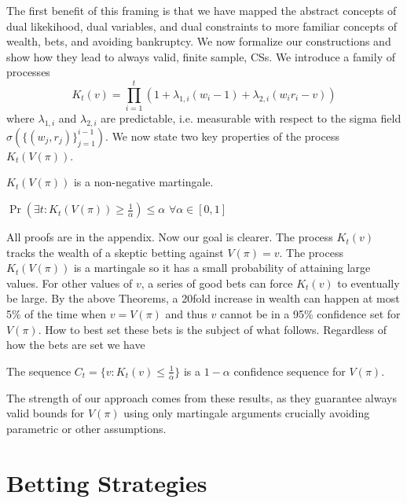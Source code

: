 The first
benefit of this framing is that we have 
mapped the abstract concepts of dual likekihood,
dual variables, and dual constraints to more familiar 
concepts of wealth, bets, and avoiding bankruptcy. 
We now formalize our constructions and
show how they lead to always valid, finite sample, 
CSs. We introduce a family of processes
\[
K_t(v) = \prod_{i=1}^t (1+\lambda_{1,i} (w_i-1) +\lambda_{2,i}(w_i r_i - v))
\]
where $\lambda_{1,i}$ and $\lambda_{2,i}$ are predictable, i.e. measurable
with respect to the sigma field $\sigma(\{(w_j,r_j)\}_{j=1}^{i-1})$.
We now state two key properties of the process $K_t(V(\pi))$.
\begin{theorem}
\label{thm:martingale}
$K_t(V(\pi))$ is a non-negative martingale.
\end{theorem}
\begin{theorem}
\label{thm:ville}
$\Pr(\exists t: K_t(V(\pi)) \geq \frac{1}{\alpha})\leq \alpha$
$\forall \alpha \in [0,1]$
\end{theorem}
All proofs are in the appendix.
Now our goal is clearer. The process $K_t(v)$ tracks the wealth
of a skeptic betting against
$V(\pi)=v$. The process $K_t(V(\pi))$ is a martingale so it has
a small probability of attaining large values. For other values 
of $v$, a series of good bets can force $K_t(v)$ to eventually
be large. 
By the above Theorems,
a 20fold increase in wealth 
can happen at most 5\% of the time when $v=V(\pi)$
and thus $v$ cannot be in a 95\% confidence set for $V(\pi)$. How to best set these bets is the subject of what follows.
Regardless of how the bets are set we have
\begin{theorem}
\label{thm:cs}
The sequence $C_t = \{v:K_t(v)\leq \frac{1}{\alpha}\}$ is a $1-\alpha$ confidence sequence for $V(\pi)$.
\end{theorem}
The strength of our approach comes from these results, as they 
guarantee always valid bounds for $V(\pi)$ using only martingale
arguments crucially avoiding parametric or other assumptions.

\section{Betting Strategies}

